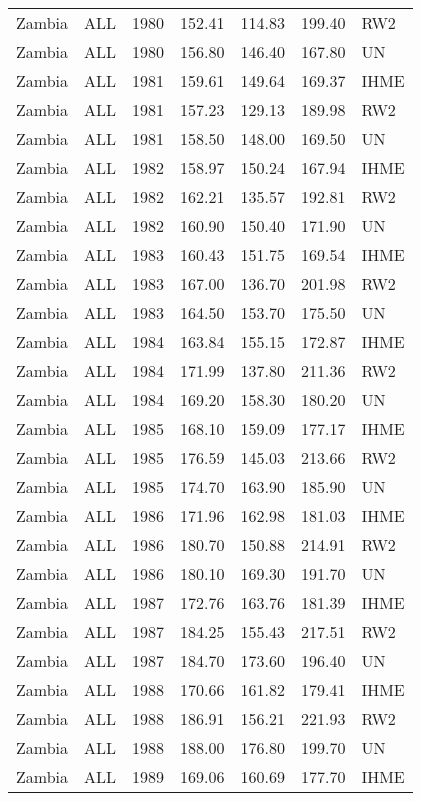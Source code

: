 \begin{longtable}{lllrrrl}
  Zambia & ALL & 1980 & 152.41 & 114.83 & 199.40 & RW2 \\ 
  Zambia & ALL & 1980 & 156.80 & 146.40 & 167.80 & UN \\ 
  Zambia & ALL & 1981 & 159.61 & 149.64 & 169.37 & IHME \\ 
  Zambia & ALL & 1981 & 157.23 & 129.13 & 189.98 & RW2 \\ 
  Zambia & ALL & 1981 & 158.50 & 148.00 & 169.50 & UN \\ 
  Zambia & ALL & 1982 & 158.97 & 150.24 & 167.94 & IHME \\ 
  Zambia & ALL & 1982 & 162.21 & 135.57 & 192.81 & RW2 \\ 
  Zambia & ALL & 1982 & 160.90 & 150.40 & 171.90 & UN \\ 
  Zambia & ALL & 1983 & 160.43 & 151.75 & 169.54 & IHME \\ 
  Zambia & ALL & 1983 & 167.00 & 136.70 & 201.98 & RW2 \\ 
  Zambia & ALL & 1983 & 164.50 & 153.70 & 175.50 & UN \\ 
  Zambia & ALL & 1984 & 163.84 & 155.15 & 172.87 & IHME \\ 
  Zambia & ALL & 1984 & 171.99 & 137.80 & 211.36 & RW2 \\ 
  Zambia & ALL & 1984 & 169.20 & 158.30 & 180.20 & UN \\ 
  Zambia & ALL & 1985 & 168.10 & 159.09 & 177.17 & IHME \\ 
  Zambia & ALL & 1985 & 176.59 & 145.03 & 213.66 & RW2 \\ 
  Zambia & ALL & 1985 & 174.70 & 163.90 & 185.90 & UN \\ 
  Zambia & ALL & 1986 & 171.96 & 162.98 & 181.03 & IHME \\ 
  Zambia & ALL & 1986 & 180.70 & 150.88 & 214.91 & RW2 \\ 
  Zambia & ALL & 1986 & 180.10 & 169.30 & 191.70 & UN \\ 
  Zambia & ALL & 1987 & 172.76 & 163.76 & 181.39 & IHME \\ 
  Zambia & ALL & 1987 & 184.25 & 155.43 & 217.51 & RW2 \\ 
  Zambia & ALL & 1987 & 184.70 & 173.60 & 196.40 & UN \\ 
  Zambia & ALL & 1988 & 170.66 & 161.82 & 179.41 & IHME \\ 
  Zambia & ALL & 1988 & 186.91 & 156.21 & 221.93 & RW2 \\ 
  Zambia & ALL & 1988 & 188.00 & 176.80 & 199.70 & UN \\ 
  Zambia & ALL & 1989 & 169.06 & 160.69 & 177.70 & IHME \\ 

\end{longtable}
